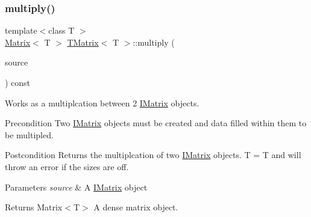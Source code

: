 \mbox{\label{class_t_matrix_a8cbfc5564a98f17727ac3fcf2ae60353}} 
\subsubsection{\texorpdfstring{multiply()}{multiply()}\hspace{0.1cm}{\footnotesize\ttfamily [1/6]}}
{\footnotesize\ttfamily template$<$class T $>$ \\
\mbox{\hyperlink{class_matrix}{Matrix}}$<$ T $>$ \mbox{\hyperlink{class_t_matrix}{T\+Matrix}}$<$ T $>$\+::multiply (\begin{DoxyParamCaption}\item[{const \mbox{\hyperlink{class_i_matrix}{I\+Matrix}}$<$ \mbox{\hyperlink{class_matrix}{Matrix}}$<$ T $>$, T $>$ \&}]{source }\end{DoxyParamCaption}) const}



Works as a multiplcation between 2 \mbox{\hyperlink{class_i_matrix}{I\+Matrix}} objects. 

\begin{DoxyPrecond}{Precondition}
Two \mbox{\hyperlink{class_i_matrix}{I\+Matrix}} objects must be created and data filled within them to be multipled. 
\end{DoxyPrecond}
\begin{DoxyPostcond}{Postcondition}
Returns the multiplcation of two \mbox{\hyperlink{class_i_matrix}{I\+Matrix}} objects. T = T and will throw an error if the sizes are off.
\end{DoxyPostcond}

\begin{DoxyParams}{Parameters}
{\em source} & A \mbox{\hyperlink{class_i_matrix}{I\+Matrix}} object \\
\hline
\end{DoxyParams}
\begin{DoxyReturn}{Returns}
Matrix$<$\+T$>$ A dense matrix object. 
\end{DoxyReturn}
\mbox{\label{class_t_matrix_aeabaac0c1812fabb7fbae685a475cd8e}} 
